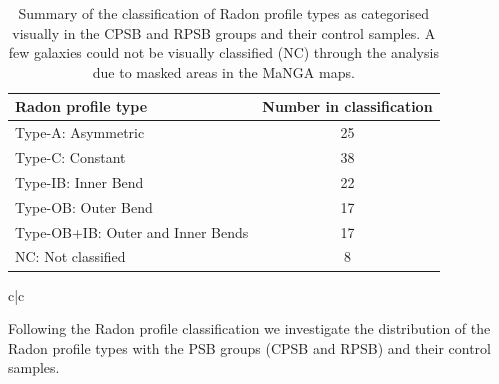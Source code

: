 \begin{table}
    \centering
    \caption{Summary of the classification of Radon profile types as categorised visually in the CPSB and RPSB groups and their control samples. A few galaxies could not be visually classified (NC) through the analysis due to masked areas in the MaNGA maps.}
    \label{tab:Radon-class-summary}
    \begin{tabular}{lc}
    \hline
    Radon profile type & Number in classification \\
    \hline
    Type-A: Asymmetric & 25 \\
    Type-C: Constant & 38 \\
    Type-IB: Inner Bend & 22 \\
    Type-OB: Outer Bend & 17 \\
    Type-OB+IB: Outer and Inner Bends & 17 \\
    NC: Not classified & 8 \\
    \hline
    \end{tabular}
\end{table}{c|c}

Following the Radon profile classification we investigate the distribution of the Radon profile types with the PSB groups (CPSB and RPSB) and their control samples. 



